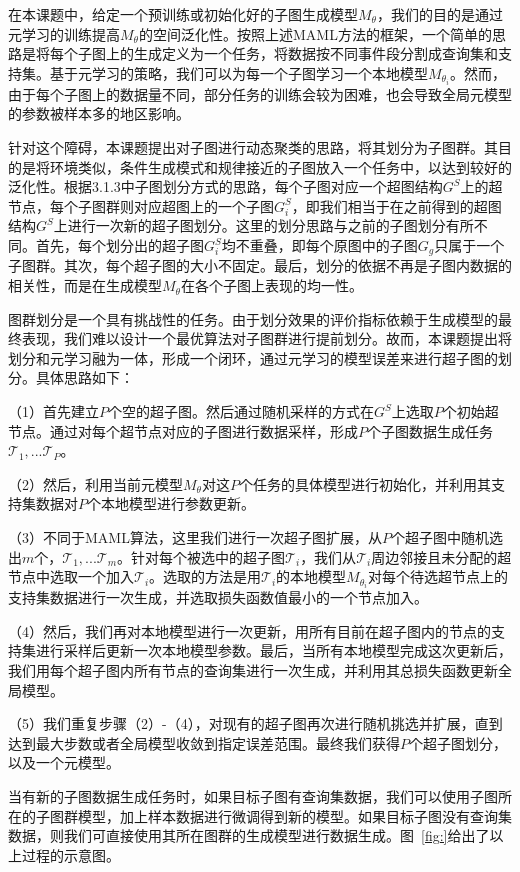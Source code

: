 \documentclass[12pt,UTF8,AutoFakeBold=2,a4paper]{ctexart} %
\begin{document}
在本课题中，给定一个预训练或初始化好的子图生成模型$M_\theta$，我们的目的是通过元学习的训练提高$M_\theta$的空间泛化性。按照上述MAML方法的框架，一个简单的思路是将每个子图上的生成定义为一个任务，将数据按不同事件段分割成查询集和支持集。基于元学习的策略，我们可以为每一个子图学习一个本地模型$M_{\theta_i}$。然而，由于每个子图上的数据量不同，部分任务的训练会较为困难，也会导致全局元模型的参数被样本多的地区影响。

针对这个障碍，本课题提出对子图进行动态聚类的思路，将其划分为子图群。其目的是将环境类似，条件生成模式和规律接近的子图放入一个任务中，以达到较好的泛化性。根据3.1.3中子图划分方式的思路，每个子图对应一个超图结构$G^S$上的超节点，每个子图群则对应超图上的一个子图$G^S_i$，即我们相当于在之前得到的超图结构$G^S$上进行一次新的超子图划分。这里的划分思路与之前的子图划分有所不同。首先，每个划分出的超子图$G^S_i$均不重叠，即每个原图中的子图$G_g$只属于一个子图群。其次，每个超子图的大小不固定。最后，划分的依据不再是子图内数据的相关性，而是在生成模型$M_\theta$在各个子图上表现的均一性。

图群划分是一个具有挑战性的任务。由于划分效果的评价指标依赖于生成模型的最终表现，我们难以设计一个最优算法对子图群进行提前划分。故而，本课题提出将划分和元学习融为一体，形成一个闭环，通过元学习的模型误差来进行超子图的划分。具体思路如下：

（1）首先建立$P$个空的超子图。然后通过随机采样的方式在$G^S$上选取$P$个初始超节点。通过对每个超节点对应的子图进行数据采样，形成$P$个子图数据生成任务$\mathcal{T}_1, ... \mathcal{T}_P$。

（2）然后，利用当前元模型$M_\theta$对这$P$个任务的具体模型进行初始化，并利用其支持集数据对$P$个本地模型进行参数更新。

（3）不同于MAML算法，这里我们进行一次超子图扩展，从$P$个超子图中随机选出$m$个，$\mathcal{T}_1, ... \mathcal{T}_m$。针对每个被选中的超子图$\mathcal{T}_i$，我们从$\mathcal{T}_i$周边邻接且未分配的超节点中选取一个加入$\mathcal{T}_i$。选取的方法是用$\mathcal{T}_i$的本地模型$M_{\theta_i}$对每个待选超节点上的支持集数据进行一次生成，并选取损失函数值最小的一个节点加入。

（4）然后，我们再对本地模型进行一次更新，用所有目前在超子图内的节点的支持集进行采样后更新一次本地模型参数。最后，当所有本地模型完成这次更新后，我们用每个超子图内所有节点的查询集进行一次生成，并利用其总损失函数更新全局模型。

（5）我们重复步骤（2）-（4），对现有的超子图再次进行随机挑选并扩展，直到达到最大步数或者全局模型收敛到指定误差范围。最终我们获得$P$个超子图划分，以及一个元模型。

当有新的子图数据生成任务时，如果目标子图有查询集数据，我们可以使用子图所在的子图群模型，加上样本数据进行微调得到新的模型。如果目标子图没有查询集数据，则我们可直接使用其所在图群的生成模型进行数据生成。图~\ref{fig:}给出了以上过程的示意图。
\end{document}
